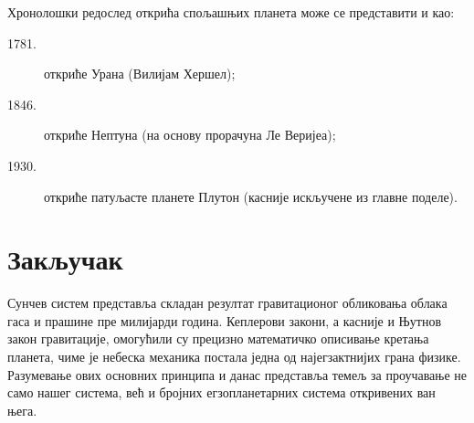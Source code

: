 \documentclass[12pt,a4paper]{article}
\begin{document}
Хронолошки редослед открића спољашњих планета може се представити и као:

\begin{description}
  \item[1781.] откриће Урана (Вилијам Хершел);
  \item[1846.] откриће Нептуна (на основу прорачуна Ле Веријеа);
  \item[1930.] откриће патуљасте планете Плутон (касније искључене из главне поделе).
\end{description}

\section{Закључак}

Сунчев систем представља складан резултат гравитационог обликовања
облака гаса и прашине пре милијарди година. Кеплерови закони, а
касније и Њутнов закон гравитације, омогућили су прецизно
математичко описивање кретања планета, чиме је небеска механика
постала једна од најегзактнијих грана физике. Разумевање ових
основних принципа и данас представља темељ за проучавање не само
нашег система, већ и бројних егзопланетарних система откривених
ван њега.
\end{document}
